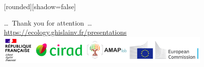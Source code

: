 \documentclass[10pt,table,dvipsnames,compress]{beamer}
\begin{document}
{
  [rounded][shadow=false]
  \begin{frame}[plain]
    \begin{block}{}
      \begin{center}
        \ldots~Thank you for attention~\ldots \\
        \url{https://ecology.ghislainv.fr/presentations} \\
        \includegraphics[width=0.8\textwidth]{figs/partners_logos}
      \end{center}
    \end{block}
  \end{frame}
}
\end{document}
